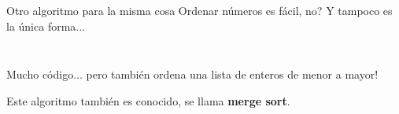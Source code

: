 \documentclass{beamer}
\begin{document}
    \begin{frame}{Otro algoritmo para la misma cosa}
        Ordenar números es fácil, no? \pause Y tampoco es la única forma... \pause \vspace{8pt}

        \begin{minipage}{.48\linewidth} 
            {\fontsize{4}{5}\selectfont
            \inputminted{cpp}{code/merge_sort1.cpp}
            }
        \end{minipage}
        \begin{minipage}{.48\linewidth}
            \inputminted[fontsize=\tiny]{cpp}{code/merge_sort2.cpp}
        \end{minipage}
        
        \pause

        Mucho código... \pause pero también ordena una lista de enteros de menor a mayor! \pause

        Este algoritmo también es conocido, se llama \textbf{merge sort}.
    \end{frame}
\end{document}
